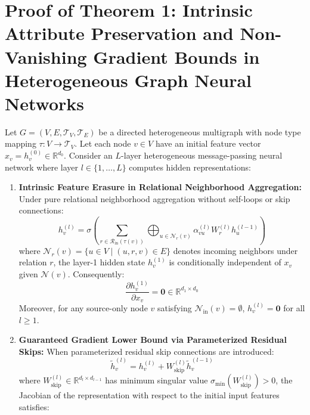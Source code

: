 \section[Proof of Theorem 1: Intrinsic Attribute Preservation and Gradient Bounds]{Proof of Theorem 1: Intrinsic Attribute Preservation and Non-Vanishing Gradient Bounds in Heterogeneous Graph Neural Networks}
\label{proof:theorem1}

\begin{theorem}
Let $G = (V, E, \mathcal{T}_V, \mathcal{T}_E)$ be a directed heterogeneous multigraph with node type mapping $\tau: V \to \mathcal{T}_V$. Let each node $v \in V$ have an initial feature vector $x_v = h_v^{(0)} \in \mathbb{R}^{d_0}$. Consider an $L$-layer heterogeneous message-passing neural network where layer $l \in \{1, \dots, L\}$ computes hidden representations:
\begin{enumerate}
    \item \textbf{Intrinsic Feature Erasure in Relational Neighborhood Aggregation:}
    Under pure relational neighborhood aggregation without self-loops or skip connections:
    \begin{equation}
    h_v^{(l)} = \sigma \left( \sum_{r \in \mathcal{R}_{\text{in}}(\tau(v))} \bigoplus_{u \in \mathcal{N}_r(v)} \alpha_{vu}^{(l)} W_r^{(l)} h_u^{(l-1)} \right)
    \end{equation}
    where $\mathcal{N}_r(v) = \{u \in V \mid (u, r, v) \in E\}$ denotes incoming neighbors under relation $r$, the layer-1 hidden state $h_v^{(1)}$ is conditionally independent of $x_v$ given $\mathcal{N}(v)$. Consequently:
    \begin{equation}
    \frac{\partial h_v^{(1)}}{\partial x_v} = \mathbf{0} \in \mathbb{R}^{d_1 \times d_0}
    \end{equation}
    Moreover, for any source-only node $v$ satisfying $\mathcal{N}_{\text{in}}(v) = \emptyset$, $h_v^{(l)} = \mathbf{0}$ for all $l \ge 1$.
    \item \textbf{Guaranteed Gradient Lower Bound via Parameterized Residual Skips:}
    When parameterized residual skip connections are introduced:
    \begin{equation}
    \tilde{h}_v^{(l)} = h_v^{(l)} + W_{\text{skip}}^{(l)} \tilde{h}_v^{(l-1)}
    \end{equation}
    where $W_{\text{skip}}^{(l)} \in \mathbb{R}^{d_l \times d_{l-1}}$ has minimum singular value $\sigma_{\min}(W_{\text{skip}}^{(l)}) > 0$, the Jacobian of the representation with respect to the initial input features satisfies:

\end{enumerate}
\end{theorem}

